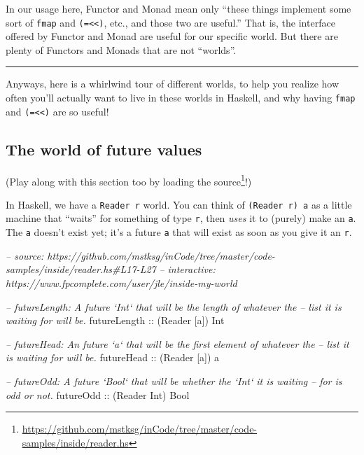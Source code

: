 \documentclass[]{article}
\newenvironment{Shaded}{}{}
\newcommand{\CommentTok}[1]{\textcolor[rgb]{0.38,0.63,0.69}{\textit{#1}}}
\newcommand{\DataTypeTok}[1]{\textcolor[rgb]{0.56,0.13,0.00}{#1}}
\newcommand{\NormalTok}[1]{#1}
\newcommand{\OtherTok}[1]{\textcolor[rgb]{0.00,0.44,0.13}{#1}}
\renewcommand{\href}[2]{#2\footnote{\url{#1}}}
\begin{document}
In our usage here, Functor and Monad mean only ``these things implement some
sort of \texttt{fmap} and \texttt{(=\textless{}\textless{})}, etc., and those
two are useful.'' That is, the interface offered by Functor and Monad are useful
for our specific world. But there are plenty of Functors and Monads that are not
``worlds''.

\begin{center}\rule{0.5\linewidth}{\linethickness}\end{center}

Anyways, here is a whirlwind tour of different worlds, to help you realize how
often you'll actually want to live in these worlds in Haskell, and why having
\texttt{fmap} and \texttt{(=\textless{}\textless{})} are so useful!

\hypertarget{the-world-of-future-values}{%
\subsection{The world of future values}\label{the-world-of-future-values}}

(Play along with this section too by
\href{https://github.com/mstksg/inCode/tree/master/code-samples/inside/reader.hs}{loading
the source}!)

In Haskell, we have a \texttt{Reader\ r} world. You can think of
\texttt{(Reader\ r)\ a} as a little machine that ``waits'' for something of type
\texttt{r}, then \emph{uses} it to (purely) make an \texttt{a}. The \texttt{a}
doesn't exist yet; it's a future \texttt{a} that will exist as soon as you give
it an \texttt{r}.

\begin{Shaded}
\begin{Highlighting}[]
\CommentTok{-- source: https://github.com/mstksg/inCode/tree/master/code-samples/inside/reader.hs#L17-L27}
\CommentTok{-- interactive: https://www.fpcomplete.com/user/jle/inside-my-world}

\CommentTok{-- futureLength: A future `Int` that will be the length of whatever the}
\CommentTok{--      list it is waiting for will be.}
\OtherTok{futureLength ::}\NormalTok{ (}\DataTypeTok{Reader}\NormalTok{ [a]) }\DataTypeTok{Int}

\CommentTok{-- futureHead: An future `a` that will be the first element of whatever the}
\CommentTok{--      list it is waiting for will be.}
\OtherTok{futureHead   ::}\NormalTok{ (}\DataTypeTok{Reader}\NormalTok{ [a]) a}

\CommentTok{-- futureOdd: A future `Bool` that will be whether the `Int` it is waiting}
\CommentTok{--      for is odd or not.}
\OtherTok{futureOdd    ::}\NormalTok{ (}\DataTypeTok{Reader} \DataTypeTok{Int}\NormalTok{) }\DataTypeTok{Bool}
\end{Highlighting}
\end{Shaded}
\end{document}
